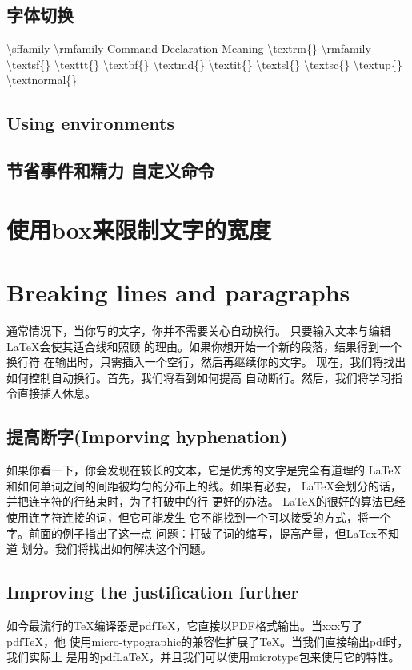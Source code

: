 	\subsection{字体切换}
	\textbackslash sffamily
	\textbackslash rmfamily
	Command		Declaration		Meaning
	\textbackslash textrm\{\}	\textbackslash rmfamily
	\textbackslash textsf\{\}
	\textbackslash texttt\{\}
	\textbackslash textbf\{\}
	\textbackslash textmd\{\}
	\textbackslash textit\{\}
	\textbackslash textsl\{\}
	\textbackslash textsc\{\}
	\textbackslash textup\{\}
	\textbackslash textnormal\{\}
	\subsection{Using environments}
	\subsection{节省事件和精力 自定义命令}
	\section{使用box来限制文字的宽度}
\section{Breaking lines and paragraphs}
通常情况下，当你写的文字，你并不需要关心自动换行。
只要输入文本与编辑LaTeX会使其适合线和照顾
的理由。如果你想开始一个新的段落，结果得到一个换行符
在输出时，只需插入一个空行，然后再继续你的文字。
现在，我们将找出如何控制自动换行。首先，我们将看到如何提高
自动断行。然后，我们将学习指令直接插入休息。
\subsection{提高断字(Imporving hyphenation)}
如果你看一下，你会发现在较长的文本，它是优秀的文字是完全有道理的
LaTeX和如何单词之间的间距被均匀的分布上的线。如果有必要，
LaTeX会划分的话，并把连字符的行结束时，为了打破中的行
更好的办法。 LaTeX的很好的算法已经使用连字符连接的词，但它可能发生
它不能找到一个可以接受的方式，将一个字。前面的例子指出了这一点
问题：打破了词的缩写，提高产量，但LaTex不知道
划分。我们将找出如何解决这个问题。
\subsection{Improving the justification further}
如今最流行的TeX编译器是pdfTeX，它直接以PDF格式输出。当xxx写了pdfTeX，他
使用micro-typographic的兼容性扩展了TeX。当我们直接输出pdf时，我们实际上
是用的pdfLaTeX，并且我们可以使用microtype包来使用它的特性。
